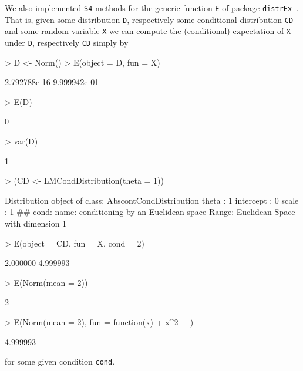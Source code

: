 \documentclass[11pt]{article}
\begin{document}
We also implemented {\tt S4} methods for the generic function {\tt E} of 
package {\tt distrEx}~\cite{distr}. That is, given some distribution {\tt D}, 
respectively some conditional distribution {\tt CD} and some random variable {\tt X}
we can compute the (conditional) expectation of {\tt X} under {\tt D}, respectively 
{\tt CD} simply by
\begin{Schunk}
\begin{Sinput}
> D <- Norm()
> E(object = D, fun = X)
\end{Sinput}
\begin{Soutput}
[1] 2.792788e-16 9.999942e-01
\end{Soutput}
\begin{Sinput}
> E(D)
\end{Sinput}
\begin{Soutput}
[1] 0
\end{Soutput}
\begin{Sinput}
> var(D)
\end{Sinput}
\begin{Soutput}
[1] 1
\end{Soutput}
\begin{Sinput}
> (CD <- LMCondDistribution(theta = 1))
\end{Sinput}
\begin{Soutput}
Distribution object of class: AbscontCondDistribution
theta :  1 
intercept :  0 
scale :  1 
## cond:
name:	conditioning by an Euclidean space
Range:	Euclidean Space with dimension 1
\end{Soutput}
\begin{Sinput}
> E(object = CD, fun = X, cond = 2)
\end{Sinput}
\begin{Soutput}
[1] 2.000000 4.999993
\end{Soutput}
\begin{Sinput}
> E(Norm(mean = 2))
\end{Sinput}
\begin{Soutput}
[1] 2
\end{Soutput}
\begin{Sinput}
> E(Norm(mean = 2), fun = function(x) {
+     x^2
+ })
\end{Sinput}
\begin{Soutput}
[1] 4.999993
\end{Soutput}
\end{Schunk}
for some given condition {\tt cond}.
\par
\end{document}
